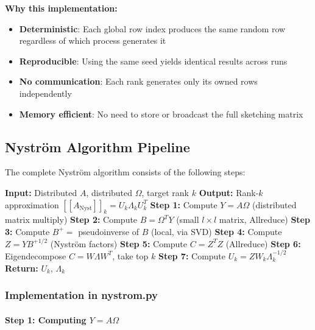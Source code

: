 \documentclass[11pt,a4paper]{article}
\begin{document}
\textbf{Why this implementation:}
\begin{itemize}
    \item \textbf{Deterministic}: Each global row index produces the same random row regardless of which process generates it
    \item \textbf{Reproducible}: Using the same seed yields identical results across runs
    \item \textbf{No communication}: Each rank generates only its owned rows independently
    \item \textbf{Memory efficient}: No need to store or broadcast the full sketching matrix
\end{itemize}

\subsection{Nyström Algorithm Pipeline}

The complete Nyström algorithm consists of the following steps:

\begin{algorithm}
\caption{Distributed Randomized Nyström Algorithm}
\begin{algorithmic}[1]
\State \textbf{Input:} Distributed $A$, distributed $\Omega$, target rank $k$
\State \textbf{Output:} Rank-$k$ approximation $[[A_{\text{Nyst}}]]_k = U_k \Lambda_k U_k^T$
\State
\State \textbf{Step 1:} Compute $Y = A\Omega$ (distributed matrix multiply)
\State \textbf{Step 2:} Compute $B = \Omega^T Y$ (small $l \times l$ matrix, Allreduce)
\State \textbf{Step 3:} Compute $B^+ = $ pseudoinverse of $B$ (local, via SVD)
\State \textbf{Step 4:} Compute $Z = Y B^{+1/2}$ (Nyström factors)
\State \textbf{Step 5:} Compute $C = Z^T Z$ (Allreduce)
\State \textbf{Step 6:} Eigendecompose $C = W\Lambda W^T$, take top $k$
\State \textbf{Step 7:} Compute $U_k = Z W_k \Lambda_k^{-1/2}$
\State \textbf{Return:} $U_k$, $\Lambda_k$
\end{algorithmic}
\end{algorithm}

\subsubsection{Implementation in nystrom.py}

\paragraph{Step 1: Computing $Y = A\Omega$}
\end{document}

